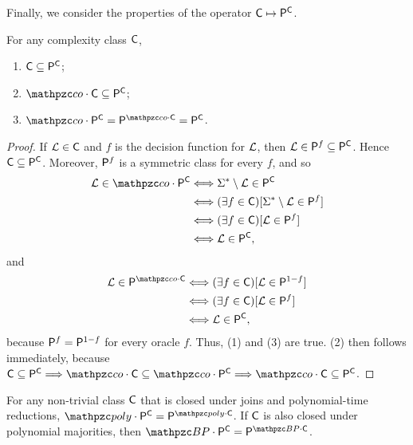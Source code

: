 Finally, we consider the properties of the operator $\mathsf{C}\mapsto\mathsf{P}^{\mathsf{C}}$.
\begin{proposition}
For any complexity class $\mathsf{C}$,
\begin{enumerate}
\item $\mathsf{C}\subseteq\mathsf{P}^{\mathsf{C}}$;
\item $\cco\cdot\sC\subseteq\sP^\sC$;
\item $\cco\cdot\sP^\sC=\sP^{\cco\cdot\sC}=\sP^\sC$.
\end{enumerate}
\end{proposition}
\begin{proof}
If $\mathcal{L}\in\mathsf{C}$ and $f$ is the decision function for $\mathcal{L}$, then
$\mathcal{L}\in\mathsf{P}^f\subseteq\mathsf{P}^{\mathsf{C}}$. Hence $\mathsf{C}\subseteq\mathsf{P}^{\mathsf{C}}$. Moreover,
$\mathsf{P}^f$ is a symmetric class for every $f$, and so
\begin{align*}
\cL\in\cco\cdot\sP^\sC
&\Longleftrightarrow\Sigma^*\setminus\cL\in\sP^\sC \\
&\Longleftrightarrow(\exists f\in\sC)[\Sigma^*\setminus\cL\in\sP^f] \\
&\Longleftrightarrow(\exists f\in\sC)[\cL\in\sP^f] \\
&\Longleftrightarrow\cL\in\sP^\sC,
\end{align*}
and
\begin{align*}
\cL\in\sP^{\cco\cdot\sC}
&\Longleftrightarrow(\exists f\in\sC)[\cL\in\sP^{1-f}] \\
&\Longleftrightarrow(\exists f\in\sC)[\cL\in\sP^f] \\
&\Longleftrightarrow\cL\in\sP^\sC,
\end{align*}
because $\mathsf{P}^f=\mathsf{P}^{1-f}$ for every oracle $f$. Thus, (1) and (3) are true. (2)
then follows immediately, because
$\sC\subseteq\sP^\sC\Longrightarrow\cco\cdot\sC
\subseteq\cco\cdot\sP^\sC\Longrightarrow\cco\cdot\sC\subseteq\sP^\sC$.
\end{proof}

\begin{proposition}
For any non-trivial class $\mathsf{C}$ that is closed under joins and polynomial-time 
reductions, $\cpoly\cdot\sP^\sC=\sP^{\cpoly\cdot\sC}$. If $\mathsf{C}$ is also closed under
polynomial majorities, then $\cBP\cdot\sP^\sC=\sP^{\cBP\cdot\sC}$.
\end{proposition}

